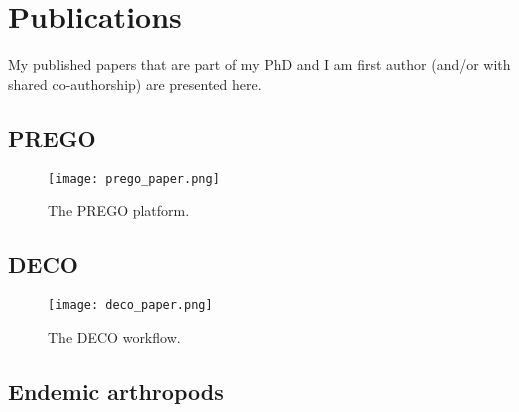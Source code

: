 \chapter{Publications}
\label{app:publications}

My published papers that are part of my PhD and I am first author (and/or with shared co-authorship) are
presented here.
\section{PREGO}

\begin{figure}[hbt!] 
    \centering\texttt{[image: prego\_paper.png]}
\caption{The PREGO platform.}
    \label{fig:prego_paper}
\end{figure}




\section{DECO}

\begin{figure}[hbt!] 
    \centering\texttt{[image: deco\_paper.png]}
\caption{The DECO workflow.}
    \label{fig:deco_paper}
\end{figure}

\section{Endemic arthropods}




